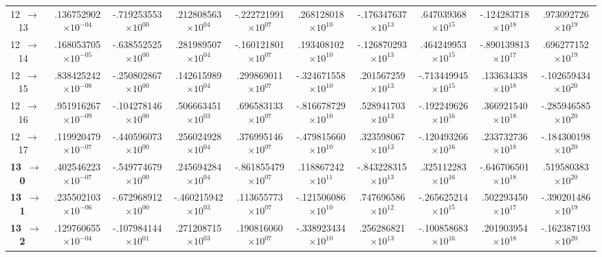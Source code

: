 \documentclass[reviewcopy]{elsarticle}
\begin{document}
\begin{landscape}
\begin{longtable}{lccccccccc}
 12~$\to$~ 13  &   .136752902$\times10^{-04}$ & -.719253553$\times10^{ 00}$ &  .212808563$\times10^{ 04}$ & -.222721991$\times10^{ 07}$ &  .268128018$\times10^{ 10}$ & -.176347637$\times10^{ 13}$ &  .647039368$\times10^{ 15}$ & -.124283718$\times10^{ 18}$ &  .973092726$\times10^{ 19}$ \\
 12~$\to$~ 14  &   .168053705$\times10^{-05}$ & -.638552525$\times10^{ 00}$ &  .281989507$\times10^{ 04}$ & -.160121801$\times10^{ 07}$ &  .193408102$\times10^{ 10}$ & -.126870293$\times10^{ 13}$ &  .464249953$\times10^{ 15}$ & -.890139813$\times10^{ 17}$ &  .696277152$\times10^{ 19}$ \\
 12~$\to$~ 15  &   .838425242$\times10^{-08}$ & -.250802867$\times10^{ 00}$ &  .142615989$\times10^{ 04}$ &  .299869011$\times10^{ 07}$ & -.324671558$\times10^{ 10}$ &  .201567259$\times10^{ 13}$ & -.713449945$\times10^{ 15}$ &  .133634338$\times10^{ 18}$ & -.102659434$\times10^{ 20}$ \\
 12~$\to$~ 16  &   .951916267$\times10^{-09}$ & -.104278146$\times10^{ 00}$ &  .506663451$\times10^{ 03}$ &  .696583133$\times10^{ 07}$ & -.816678729$\times10^{ 10}$ &  .528941703$\times10^{ 13}$ & -.192249626$\times10^{ 16}$ &  .366921540$\times10^{ 18}$ & -.285946585$\times10^{ 20}$ \\
 12~$\to$~ 17  &   .119920479$\times10^{-07}$ & -.440596073$\times10^{ 00}$ &  .256024928$\times10^{ 04}$ &  .376995146$\times10^{ 07}$ & -.479815660$\times10^{ 10}$ &  .323598067$\times10^{ 13}$ & -.120493266$\times10^{ 16}$ &  .233732736$\times10^{ 18}$ & -.184300198$\times10^{ 20}$ \\[7pt]
{\bf 13~$\to$~ 0}   &   .402546223$\times10^{-07}$ & -.549774679$\times10^{ 00}$ &  .245694284$\times10^{ 04}$ & -.861855479$\times10^{ 07}$ &  .118867242$\times10^{ 11}$ & -.843228315$\times10^{ 13}$ &  .325112283$\times10^{ 16}$ & -.646706501$\times10^{ 18}$ &  .519580383$\times10^{ 20}$ \\
{\bf 13~$\to$~ 1}   &   .235502103$\times10^{-06}$ & -.672968912$\times10^{ 00}$ & -.460215942$\times10^{ 03}$ &  .113655773$\times10^{ 07}$ & -.121506086$\times10^{ 10}$ &  .747696586$\times10^{ 12}$ & -.265625214$\times10^{ 15}$ &  .502293450$\times10^{ 17}$ & -.390201486$\times10^{ 19}$ \\
{\bf 13~$\to$~ 2}   &   .129760655$\times10^{-04}$ & -.107984144$\times10^{ 01}$ &  .271208715$\times10^{ 03}$ &  .190816060$\times10^{ 07}$ & -.338923434$\times10^{ 10}$ &  .256286821$\times10^{ 13}$ & -.100858683$\times10^{ 16}$ &  .201903954$\times10^{ 18}$ & -.162387193$\times10^{ 20}$ \\

\end{longtable}
\end{landscape}
\end{document}
